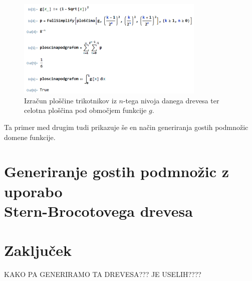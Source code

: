 \documentclass[a4paper, 12pt, titlepage]{article}
\begin{document}
\begin{figure}[h!]
    \centering
    \includegraphics[width=0.8\textwidth]{slike/ilustrativen_primer_wolfram.png}
    \caption{Izračun ploščine trikotnikov iz $ n $-tega nivoja danega drevesa ter celotna ploščina pod območjem funkcije $ g $.}
    \label{ilustrativen_primer_wolfram}
\end{figure}

Ta primer med drugim tudi prikazuje še en način generiranja gostih podmnožic domene funkcije.

\section{Generiranje gostih podmnožic z uporabo \\ Stern-Brocotovega drevesa}


\newpage
\section{Zaključek}

KAKO PA GENERIRAMO TA DREVESA??? JE USELIH????

\newpage
\newpage
\nocite{*}      %
\printbibliography
\end{document}
